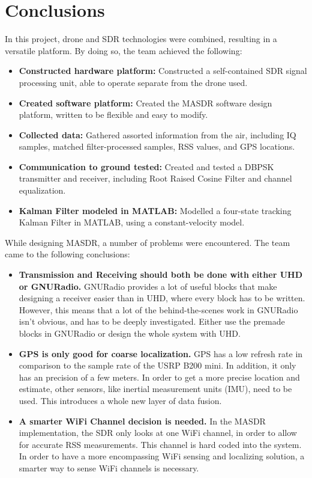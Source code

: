 \chapter{Conclusions}
In this project, drone and SDR technologies were combined, resulting in a versatile platform. By doing so, 
the team achieved the following:

\begin{itemize} 
 \item \textbf{Constructed hardware platform: }Constructed a self-contained SDR signal processing
                unit, able to operate separate from the drone used.
 \item \textbf{Created software platform: }Created the MASDR software design platform,
                written to be flexible and easy to modify. 
 \item \textbf{Collected data: }Gathered assorted information from the air, including 
                IQ samples, matched filter-processed samples, RSS values, and GPS locations.
 \item \textbf{Communication to ground tested: }Created and tested a DBPSK transmitter and receiver, 
                including Root Raised Cosine Filter and channel equalization. 
 \item \textbf{Kalman Filter modeled in MATLAB: }Modelled a four-state tracking Kalman Filter
                in MATLAB, using a constant-velocity model.
\end{itemize} \par
While designing MASDR, a number of problems were encountered. The team came to the following 
conclusions:
\begin{itemize}
 \item \textbf{Transmission and Receiving should both be done with either UHD or GNURadio.} 
                GNURadio provides a lot of useful blocks that make designing a receiver easier than in
                UHD, where every block has to be written. However, this means that a lot of the behind-the-scenes
                work in GNURadio isn't obvious, and has to be deeply investigated. Either use the premade blocks 
                in GNURadio or design the whole system with UHD.
 \item \textbf{GPS is only good for coarse localization.} 
                GPS has a low refresh rate in comparison to the 
                sample rate of the USRP B200 mini. In addition, it only has an precision of
                a few meters. In order to get a more precise location and estimate,
                other sensors, like inertial measurement units (IMU), need to be used. 
                This introduces a whole new layer of data fusion.
 \item \textbf{A smarter WiFi Channel decision is needed.} 
                In the MASDR implementation, the SDR
                only looks at one WiFi channel, in order to allow for accurate RSS measurements. 
                This channel is hard coded into the system. In order to have a more encompassing 
                WiFi sensing and localizing solution, a smarter way to sense WiFi channels is 
                necessary.
\end{itemize} \par

